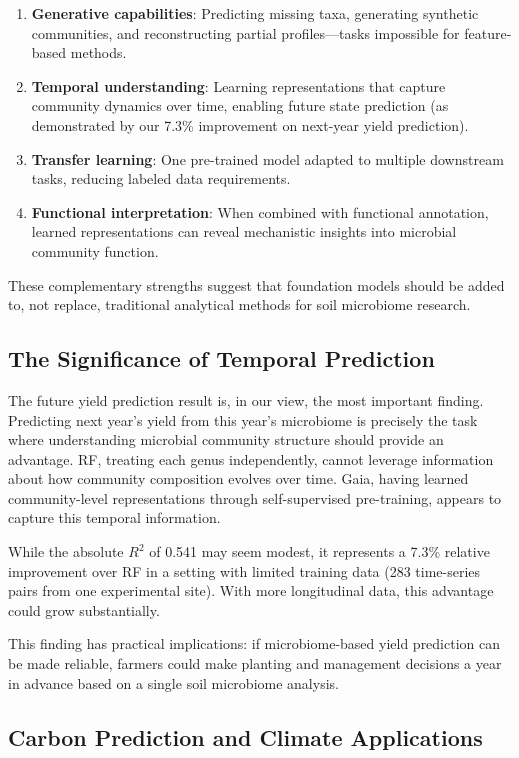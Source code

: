 \documentclass[11pt,a4paper]{article}
\begin{document}
\begin{enumerate}[leftmargin=1.5em]
    \item \textbf{Generative capabilities}: Predicting missing taxa, generating synthetic communities, and reconstructing partial profiles---tasks impossible for feature-based methods.
    \item \textbf{Temporal understanding}: Learning representations that capture community dynamics over time, enabling future state prediction (as demonstrated by our 7.3\% improvement on next-year yield prediction).
    \item \textbf{Transfer learning}: One pre-trained model adapted to multiple downstream tasks, reducing labeled data requirements.
    \item \textbf{Functional interpretation}: When combined with functional annotation, learned representations can reveal mechanistic insights into microbial community function.
\end{enumerate}

These complementary strengths suggest that foundation models should be added to, not replace, traditional analytical methods for soil microbiome research.

\subsection{The Significance of Temporal Prediction}

The future yield prediction result is, in our view, the most important finding. Predicting next year's yield from this year's microbiome is precisely the task where understanding microbial community structure should provide an advantage. RF, treating each genus independently, cannot leverage information about how community composition evolves over time. Gaia, having learned community-level representations through self-supervised pre-training, appears to capture this temporal information.

While the absolute $R^2$ of 0.541 may seem modest, it represents a 7.3\% relative improvement over RF in a setting with limited training data (283 time-series pairs from one experimental site). With more longitudinal data, this advantage could grow substantially.

This finding has practical implications: if microbiome-based yield prediction can be made reliable, farmers could make planting and management decisions a year in advance based on a single soil microbiome analysis.

\subsection{Carbon Prediction and Climate Applications}
\end{document}
